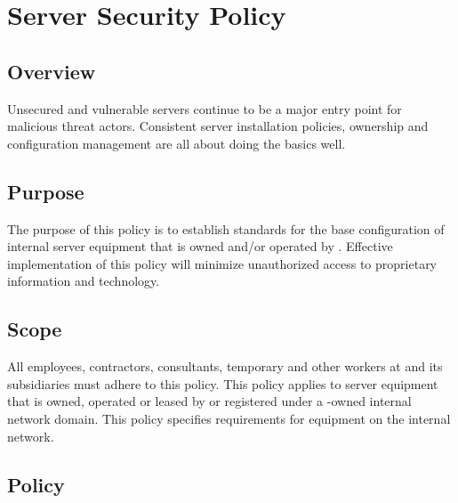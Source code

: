 \chapter{Server Security Policy}
\CommonIntroduction
\section{Overview}
Unsecured and vulnerable servers continue to be a major entry point for malicious threat actors.  
Consistent server installation policies, ownership and configuration management are all about doing the basics well. 
\section{Purpose}
The purpose of this policy is to establish standards for the base configuration of internal server equipment that is owned and/or operated by \CompanyName{}.  
Effective implementation of this policy will minimize unauthorized access to \CompanyName{} proprietary information and technology.
\section{Scope}
All employees, contractors, consultants, temporary\oxford{} and other workers at  and its subsidiaries must adhere to this policy.  
This policy applies to server equipment that is owned, operated\oxford{} or leased by  or registered under a -owned internal network domain. 
This policy specifies requirements for equipment on the internal  network.  
\section{Policy}

